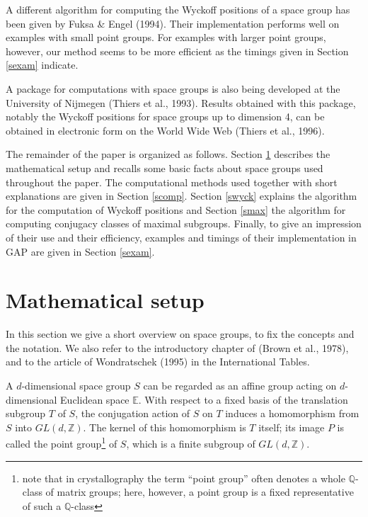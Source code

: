 \documentclass[12pt]{amsart}
\newcommand{\E}{{\mathbb E}}
\newcommand{\Q}{{\mathbb Q}}
\newcommand{\Z}{{\mathbb Z}}
\newcommand{\GAP}{{\sf GAP}}
\begin{document}
A different algorithm for computing the Wyckoff positions of a space
group has been given by Fuksa \& Engel (1994). Their implementation 
performs well on examples with small point groups. For examples with 
larger point groups, however, our method seems to be more efficient 
as the timings given in Section \ref{sexam} indicate.

A package for computations with space groups is also being developed
at the University of Nijmegen (Thiers et al., 1993). Results
obtained with this package, notably the Wyckoff positions for space
groups up to dimension 4, can be obtained in electronic form on
the World Wide Web (Thiers et al., 1996).

The remainder of the paper is organized as follows. Section
\ref{smath} describes the mathematical setup and recalls some basic
facts about space groups used throughout the paper. The computational
methods used together with short explanations are given in Section
\ref{scomp}.  Section \ref{swyck} explains the algorithm for the
computation of Wyckoff positions and Section \ref{smax} the algorithm
for computing conjugacy classes of maximal subgroups.  Finally, to
give an impression of their use and their efficiency, examples and
timings of their implementation in {\GAP} are given in Section
\ref{sexam}.

\section{Mathematical setup} 
\label{smath}

In this section we give a short overview on space groups, to fix the 
concepts and the notation. We also refer to the introductory chapter 
of (Brown et al., 1978), and to the article of Wondratschek (1995) 
in the International Tables.

A $d$-dimensional space group $S$ can be regarded as an affine group 
acting on $d$-dimensional Euclidean space $\E$. With respect to a 
fixed basis of the translation subgroup $T$ of $S$, the conjugation 
action of $S$ on $T$ induces a homomorphism from $S$ into $GL(d, \Z)$. 
The kernel of this homomorphism is $T$ itself; its image $P$ is called 
the point group\footnote{note that in crystallography the term 
``point group'' often denotes a whole $\Q$-class of matrix groups; 
here, however, a point group is a fixed representative of such a 
$\Q$-class} of $S$, which is a finite subgroup of $GL(d, \Z)$.
\end{document}
